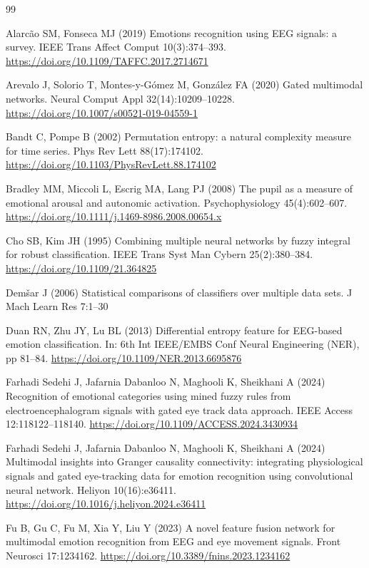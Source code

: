 \documentclass[11pt,a4paper]{article}
\begin{document}
\small
\begin{thebibliography}{99}

 Alarc\~ao SM, Fonseca MJ (2019) Emotions recognition using EEG signals: a survey. IEEE Trans Affect Comput 10(3):374--393. \url{https://doi.org/10.1109/TAFFC.2017.2714671}

 Arevalo J, Solorio T, Montes-y-G\'omez M, Gonz\'alez FA (2020) Gated multimodal networks. Neural Comput Appl 32(14):10209--10228. \url{https://doi.org/10.1007/s00521-019-04559-1}

 Bandt C, Pompe B (2002) Permutation entropy: a natural complexity measure for time series. Phys Rev Lett 88(17):174102. \url{https://doi.org/10.1103/PhysRevLett.88.174102}

 Bradley MM, Miccoli L, Escrig MA, Lang PJ (2008) The pupil as a measure of emotional arousal and autonomic activation. Psychophysiology 45(4):602--607. \url{https://doi.org/10.1111/j.1469-8986.2008.00654.x}

 Cho SB, Kim JH (1995) Combining multiple neural networks by fuzzy integral for robust classification. IEEE Trans Syst Man Cybern 25(2):380--384. \url{https://doi.org/10.1109/21.364825}

 Dem\v{s}ar J (2006) Statistical comparisons of classifiers over multiple data sets. J Mach Learn Res 7:1--30

 Duan RN, Zhu JY, Lu BL (2013) Differential entropy feature for EEG-based emotion classification. In: 6th Int IEEE/EMBS Conf Neural Engineering (NER), pp 81--84. \url{https://doi.org/10.1109/NER.2013.6695876}

 Farhadi Sedehi J, Jafarnia Dabanloo N, Maghooli K, Sheikhani A (2024) Recognition of emotional categories using mined fuzzy rules from electroencephalogram signals with gated eye track data approach. IEEE Access 12:118122--118140. \url{https://doi.org/10.1109/ACCESS.2024.3430934}

 Farhadi Sedehi J, Jafarnia Dabanloo N, Maghooli K, Sheikhani A (2024) Multimodal insights into Granger causality connectivity: integrating physiological signals and gated eye-tracking data for emotion recognition using convolutional neural network. Heliyon 10(16):e36411. \url{https://doi.org/10.1016/j.heliyon.2024.e36411}

 Fu B, Gu C, Fu M, Xia Y, Liu Y (2023) A novel feature fusion network for multimodal emotion recognition from EEG and eye movement signals. Front Neurosci 17:1234162. \url{https://doi.org/10.3389/fnins.2023.1234162}


\end{thebibliography}
\end{document}
